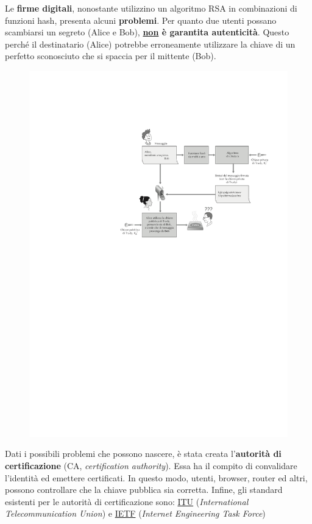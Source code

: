 \documentclass[a4paper]{article}
\begin{document}
	Le \textbf{firme digitali}, nonostante utilizzino un algoritmo RSA in combinazioni di funzioni hash, presenta alcuni \textbf{problemi}. Per quanto due utenti possano scambiarsi un segreto (Alice e Bob), \textbf{\underline{non} è garantita autenticità}. Questo perché il destinatario (Alice) potrebbe erroneamente utilizzare la chiave di un perfetto sconosciuto che si spaccia per il mittente (Bob).
	\begin{figure}[!htp]
		\centering
		\includegraphics[width=\textwidth]{img/int-aut_e_autor/firma_digitale-problemi.pdf}
	\end{figure}
	
	\noindent
	Dati i possibili problemi che possono nascere, è stata creata l'\textcolor{Red3}{\textbf{autorità di certificazione}} (CA, \emph{certification authority}). Essa ha il compito di convalidare l'identità ed emettere certificati. In questo modo, utenti, browser, router ed altri, possono controllare che la chiave pubblica sia corretta. Infine, gli standard esistenti per le autorità di certificazione sono: \href{https://en.wikipedia.org/wiki/International_Telecommunication_Union}{ITU} (\emph{International Telecommunication Union}) e \href{https://en.wikipedia.org/wiki/Internet_Engineering_Task_Force}{IETF} (\emph{Internet Engineering Task Force})\newpage
	
\end{document}
